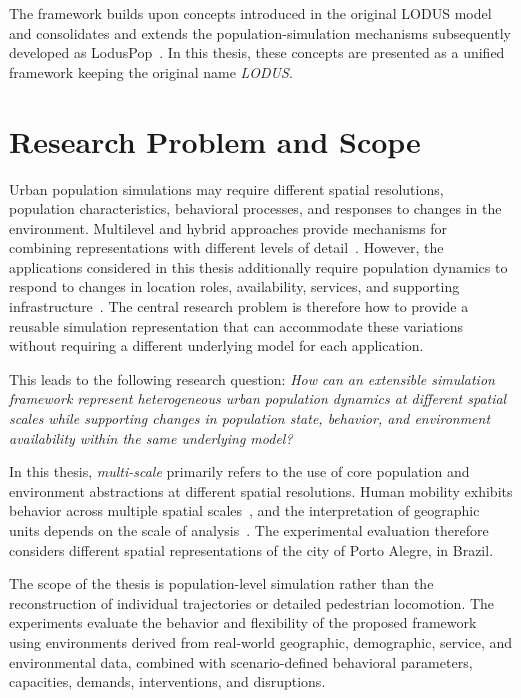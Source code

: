 The framework builds upon concepts introduced in the original LODUS model~\cite{silva2020lodus} and consolidates and extends the population-simulation mechanisms subsequently developed as LodusPop~\cite{silva2026lodusPop}. In this thesis, these concepts are presented as a unified framework keeping the original name \textit{LODUS}.


\section{Research Problem and Scope}
\label{sec:introduction_problem}

Urban population simulations may require different spatial resolutions, population characteristics, behavioral processes, and responses to changes in the environment. Multilevel and hybrid approaches provide mechanisms for combining representations with different levels of detail~\cite{serana2023multilevelmodeling,ijaz2015hybridSurvey,xiong2010hybrid}. However, the applications considered in this thesis additionally require population dynamics to respond to changes in location roles, availability, services, and supporting infrastructure~\cite{haraguchi2022mobilityDataReview,ye2023digitalTwinResiliance}. The central research problem is therefore how to provide a reusable simulation representation that can accommodate these variations without requiring a different underlying model for each application.

This leads to the following research question: \textit{How can an extensible simulation framework represent heterogeneous urban population dynamics at different spatial scales while supporting changes in population state, behavior, and environment availability within the same underlying model?}

In this thesis, \textit{multi-scale} primarily refers to the use of core 
population and environment abstractions at different spatial resolutions. Human mobility exhibits behavior across multiple spatial scales~\cite{natureAlessandretti2017multiScaleSpatioTemporal,alessandretti2020nature}, and the interpretation of geographic units depends on the scale of analysis~\cite{naturePaasi2004placeAndRegion}. The experimental evaluation therefore considers different spatial representations of the city of Porto Alegre, in Brazil.

The scope of the thesis is population-level simulation rather than the reconstruction of individual trajectories or detailed pedestrian locomotion. The experiments evaluate the behavior and flexibility of the proposed framework using environments derived from real-world geographic, demographic, service, and environmental data, combined with scenario-defined behavioral parameters, capacities, demands, interventions, and disruptions. %


